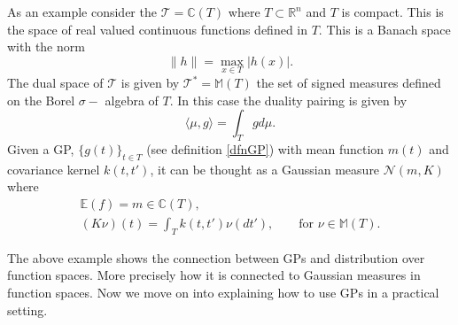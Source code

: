 \documentclass[12pt]{book}
\newcommand{\E}{\mathbb{E}} %
\newcommand{\tvs}{\mathscr{T}} %
\begin{document}

As an example consider the  $\tvs=\mathbb{C}(T)$ where 
$T\subset\mathbb{R}^{n}$ and $T$ is compact. This is the  space of real valued continuous functions 
defined in 
$T$. This  is a Banach
space with the norm \cite{bressan1900lecture}
\begin{equation*}
\|h\|=\max_{x\in T}|h(x)|.
\end{equation*}
The dual space of $\tvs$ is given by $\tvs^{*}=\mathbb{M}(T)$ the set of signed measures defined on 
the Borel $\sigma-$ algebra of  $T$. In this 
case the duality pairing is given by 
\begin{equation*}
\langle\mu,g \rangle=\int_{T}gd\mu.
\end{equation*}
Given a GP,  $\{g(t)\}_{t\in T}$ (see definition \ref{dfnGP}) with mean function $m(t)$ and 
covariance kernel $k(t,t')$, it can be thought as a Gaussian measure $\mathcal{N}(m,K)$
where
\cite{lifshits2012lectures} 
\begin{eqnarray*}
\E(f)=m\in\mathbb{C}(T), \\
(K\nu)(t)=\int_{T}k(t,t')\nu(dt'),\qquad\text{for }\nu\in\mathbb{M}(T).
\end{eqnarray*}

The above example shows the connection between GPs and distribution over function spaces. More
precisely how it is connected to Gaussian measures in function spaces. Now we move on
into explaining how to use GPs in a practical setting.
\end{document}
